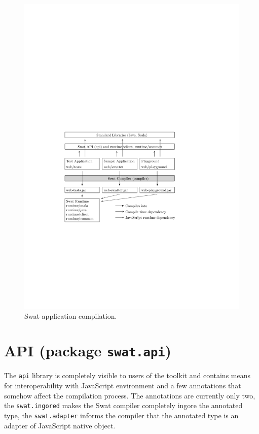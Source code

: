 \documentclass[12pt,a4paper]{report}
\begin{document}
\begin{figure}[ht]
  \centering
	\includegraphics[width=\linewidth,height=\textheight,keepaspectratio]{img/AppCompilation.pdf}
	\caption{Swat application compilation.}
	\label{AppCompilation}
\end{figure}

\section{API (package \texttt{swat.api})}

The \texttt{api} library is completely visible to users of the toolkit and contains means for interoperability with JavaScript environment and a few annotations that somehow affect the compilation process. The annotations are currently only two, the \texttt{swat.ingored} makes the Swat compiler completely ingore the annotated type, the \texttt{swat.adapter} informs the compiler that the annotated type is an adapter of JavaScript native object.
\end{document}
